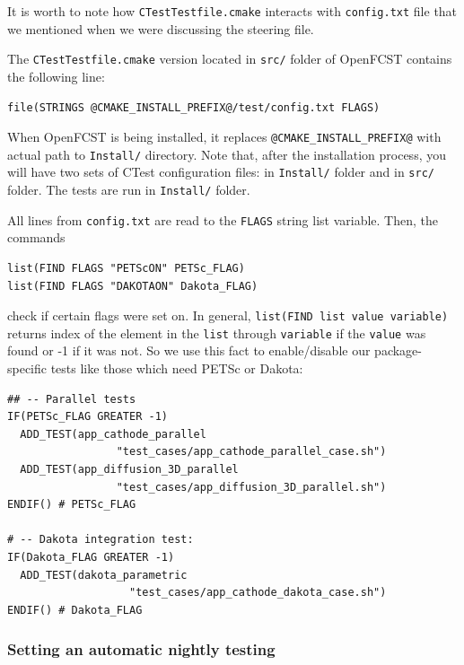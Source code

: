 It is worth to note how \verb!CTestTestfile.cmake! interacts with \verb!config.txt! file that we mentioned when we were discussing the steering file.

The \verb!CTestTestfile.cmake! version located in \verb!src/! folder of OpenFCST contains the following line:

\small \begin{lstlisting}
file(STRINGS @CMAKE_INSTALL_PREFIX@/test/config.txt FLAGS)
\end{lstlisting}\normalsize

When OpenFCST is being installed, it replaces \verb!@CMAKE_INSTALL_PREFIX@! with actual path to \verb!Install/! directory. Note that, after the installation process, you will have two sets of CTest configuration files: in \verb!Install/! folder and in \verb!src/! folder. The tests are run in \verb!Install/! folder.

All lines from \verb!config.txt! are read to the \verb!FLAGS! string list variable. Then, the commands

\small \begin{lstlisting}
list(FIND FLAGS "PETScON" PETSc_FLAG)
list(FIND FLAGS "DAKOTAON" Dakota_FLAG)
\end{lstlisting}\normalsize

\noindent check if certain flags were set on. In general, \verb!list(FIND list value variable)! returns index of the element in the \verb!list! through \verb!variable! if the \verb!value! was found or -1 if it was not. So we use this fact to enable/disable our package-specific tests like those which need PETSc or Dakota:

\small \begin{lstlisting}
## -- Parallel tests
IF(PETSc_FLAG GREATER -1)
  ADD_TEST(app_cathode_parallel
                 "test_cases/app_cathode_parallel_case.sh")
  ADD_TEST(app_diffusion_3D_parallel
                 "test_cases/app_diffusion_3D_parallel.sh")
ENDIF() # PETSc_FLAG

# -- Dakota integration test:
IF(Dakota_FLAG GREATER -1)
  ADD_TEST(dakota_parametric
                   "test_cases/app_cathode_dakota_case.sh")
ENDIF() # Dakota_FLAG
\end{lstlisting}\normalsize

\subsubsection{Setting an automatic nightly testing}

